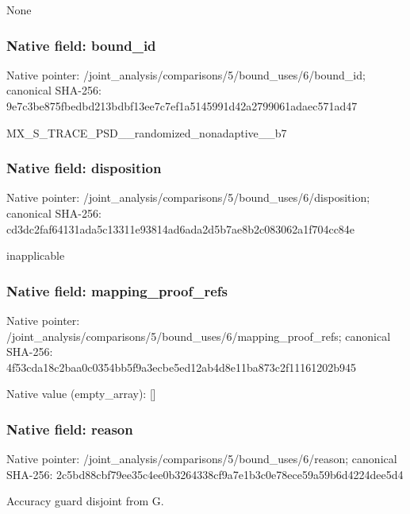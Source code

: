 \documentclass[10pt,a4paper]{article}
\begin{document}
\begingroup\raggedright\sloppy None\par\endgroup

\subsubsection{Native field: bound\_\allowbreak{}id}
Native pointer: /joint\_\allowbreak{}analysis/comparisons/5/bound\_\allowbreak{}uses/6/bound\_\allowbreak{}id; canonical SHA-256: 9e7c3be875fbedbd213bdbf13ee7c7ef1a5145991d42a2799061adaec571ad47

\begingroup\raggedright\sloppy MX\_\allowbreak{}S\_\allowbreak{}TRACE\_\allowbreak{}PSD\_\allowbreak{}\_\allowbreak{}randomized\_\allowbreak{}nonadaptive\_\allowbreak{}\_\allowbreak{}b7\par\endgroup

\subsubsection{Native field: disposition}
Native pointer: /joint\_\allowbreak{}analysis/comparisons/5/bound\_\allowbreak{}uses/6/disposition; canonical SHA-256: cd3dc2faf64131ada5c13311e93814ad6ada2d5b7ae8b2c083062a1f704cc84e

\begingroup\raggedright\sloppy inapplicable\par\endgroup

\subsubsection{Native field: mapping\_\allowbreak{}proof\_\allowbreak{}refs}
Native pointer: /joint\_\allowbreak{}analysis/comparisons/5/bound\_\allowbreak{}uses/6/mapping\_\allowbreak{}proof\_\allowbreak{}refs; canonical SHA-256: 4f53cda18c2baa0c0354bb5f9a3ecbe5ed12ab4d8e11ba873c2f11161202b945

Native value (empty\_\allowbreak{}array): []

\subsubsection{Native field: reason}
Native pointer: /joint\_\allowbreak{}analysis/comparisons/5/bound\_\allowbreak{}uses/6/reason; canonical SHA-256: 2c5bd88cbf79ee35c4ee0b3264338cf9a7e1b3c0e78ece59a59b6d4224dee5d4

\begingroup\raggedright\sloppy Accuracy guard disjoint from G.\par\endgroup
\end{document}
